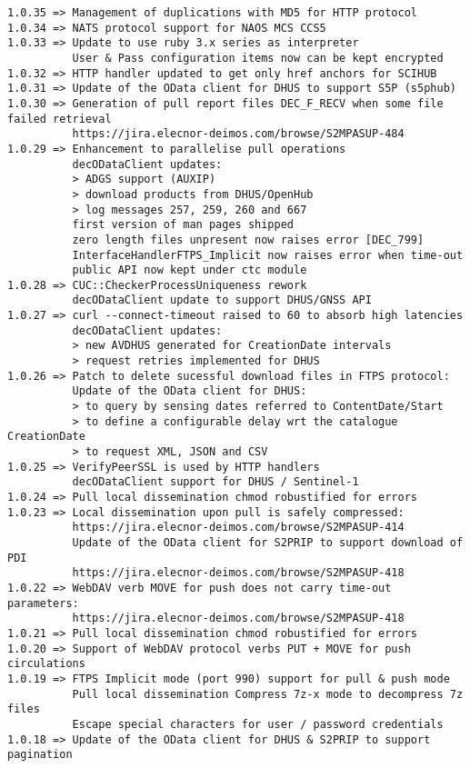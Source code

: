 \documentclass[dec_sum_main.tex]{subfiles}
\begin{document}
\begin{Verbatim}[tabsize=4]
1.0.35 => Management of duplications with MD5 for HTTP protocol
1.0.34 => NATS protocol support for NAOS MCS CCS5
1.0.33 => Update to use ruby 3.x series as interpreter
          User & Pass configuration items now can be kept encrypted
1.0.32 => HTTP handler updated to get only href anchors for SCIHUB
1.0.31 => Update of the OData client for DHUS to support S5P (s5phub)
1.0.30 => Generation of pull report files DEC_F_RECV when some file failed retrieval
          https://jira.elecnor-deimos.com/browse/S2MPASUP-484
1.0.29 => Enhancement to parallelise pull operations
          decODataClient updates:
          > ADGS support (AUXIP)
          > download products from DHUS/OpenHub
          > log messages 257, 259, 260 and 667
          first version of man pages shipped
          zero length files unpresent now raises error [DEC_799]
          InterfaceHandlerFTPS_Implicit now raises error when time-out 
          public API now kept under ctc module
1.0.28 => CUC::CheckerProcessUniqueness rework
          decODataClient update to support DHUS/GNSS API
1.0.27 => curl --connect-timeout raised to 60 to absorb high latencies
          decODataClient updates:
          > new AVDHUS generated for CreationDate intervals
          > request retries implemented for DHUS
1.0.26 => Patch to delete sucessful download files in FTPS protocol:
          Update of the OData client for DHUS:
          > to query by sensing dates referred to ContentDate/Start
          > to define a configurable delay wrt the catalogue CreationDate
          > to request XML, JSON and CSV
1.0.25 => VerifyPeerSSL is used by HTTP handlers
          decODataClient support for DHUS / Sentinel-1
1.0.24 => Pull local dissemination chmod robustified for errors
1.0.23 => Local dissemination upon pull is safely compressed:
          https://jira.elecnor-deimos.com/browse/S2MPASUP-414
          Update of the OData client for S2PRIP to support download of PDI
          https://jira.elecnor-deimos.com/browse/S2MPASUP-418
1.0.22 => WebDAV verb MOVE for push does not carry time-out parameters:
          https://jira.elecnor-deimos.com/browse/S2MPASUP-418
1.0.21 => Pull local dissemination chmod robustified for errors
1.0.20 => Support of WebDAV protocol verbs PUT + MOVE for push circulations
1.0.19 => FTPS Implicit mode (port 990) support for pull & push mode
          Pull local dissemination Compress 7z-x mode to decompress 7z files
          Escape special characters for user / password credentials
1.0.18 => Update of the OData client for DHUS & S2PRIP to support pagination

\end{Verbatim}
\end{document}
